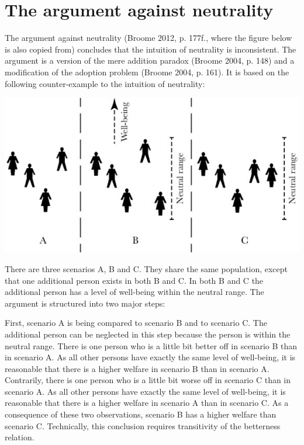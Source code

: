 \chapter{The argument against neutrality}

The argument against neutrality (\label{ref:RNDVrb2Fg6EjX}Broome 2012, p. 177f., where the figure below is also copied from) concludes that the intuition of neutrality is inconsistent. The argument is a version of the mere addition paradox (\label{ref:RNDn8ybKRhpdp}Broome 2004, p. 148) and a modification of the adoption problem (\label{ref:RND0coQvEEBxt}Broome 2004, p. 161). It is based on the following counter-example to the intuition of neutrality:  

\includegraphics{fig-1}  

There are three scenarios A, B and C. They share the same population, except that one additional person exists in both B and C. In both B and C the additional person has a level of well-being within the neutral range. The argument is structured into two major steps:  

First, scenario A is being compared to scenario B and to scenario C. The additional person can be neglected in this step because the person is within the neutral range. There is one person who is a little bit better off in scenario B than in scenario A. As all other persons have exactly the same level of well-being, it is reasonable that there is a higher welfare in scenario B than in scenario A. Contrarily, there is one person who is a little bit worse off in scenario C than in scenario A. As all other persons have exactly the same level of well-being, it is reasonable that there is a higher welfare in scenario A than in scenario C. As a consequence of these two observations, scenario B has a higher welfare than scenario C. Technically, this conclusion requires transitivity of the betterness relation.  

